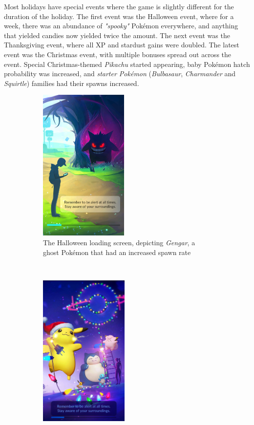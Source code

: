 Most holidays have special events where the game is slightly different for the duration of the holiday. The first event was the Halloween event, where for a week, there was an abundance of \emph{"spooky"} Pokémon everywhere, and anything that yielded candies now yielded twice the amount. The next event was the Thanksgiving event, where all XP and stardust gains were doubled. The latest event was the Christmas event, with multiple bonuses spread out across the event. Special Christmas-themed \emph{Pikachu} started appearing, baby Pokémon hatch probability was increased, and \emph{starter Pokémon} (\emph{Bulbasaur}, \emph{Charmander} and \emph{Squirtle}) families had their spawns increased.

\begin{figure}[h]
	\centering
	\begin{subfigure}[t]{0.3\textwidth}
		\includegraphics[height=3in]{Figures/pogo-loading-screen-halloween}
		\caption{The Halloween loading screen, depicting \emph{Gengar}, a ghost Pokémon that had an increased spawn rate}
	\end{subfigure}
	~
	\begin{subfigure}[t]{0.3\textwidth}
		\includegraphics[height=3in]{Figures/pogo-loading-screen-christmas}

\end{subfigure}
\end{figure}
